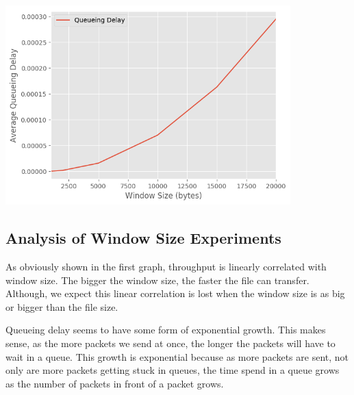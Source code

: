 \documentclass[fleqn,11pt]{article}
\begin{document}
\includegraphics[width=11cm]{lab2-graph2}\\

\subsection{Analysis of Window Size Experiments}
As obviously shown in the first graph, throughput is linearly correlated with window size. The bigger the window size, the faster the file can transfer. Although, we expect this linear correlation is lost when the window size is as big or bigger than the file size. 

Queueing delay seems to have some form of exponential growth. This makes sense, as the more packets we send at once, the longer the packets will have to wait in a queue. This growth is exponential because as more packets are sent, not only are more packets getting stuck in queues, the time spend in a queue grows as the number of packets in front of a packet grows.
\end{document}
